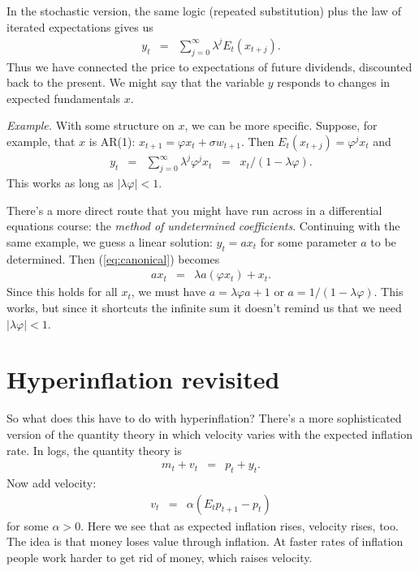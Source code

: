 \documentclass[11pt]{article}
\begin{document}
In the stochastic version, the same logic (repeated substitution)
plus the law of iterated expectations gives us
\begin{eqnarray}
    y_t &=&  \sum_{j=0}^\infty \lambda^j E_t (x_{t+j}) .
    \label{eq:canonical-solution}
\end{eqnarray}
Thus we have connected the price to expectations of future dividends,
discounted back to the present.
We might say that the variable $y$ responds to changes in expected fundamentals $x$.


{\it Example.\/}
With some structure on $x$, we can be more specific.
Suppose, for example, that $x$ is AR(1):
$ x_{t+1} = \varphi x_t + \sigma w_{t+1}$.
Then $ E_t (x_{t+j}) = \varphi^j x_t $ and
\begin{eqnarray*}
    y_t &=&  \sum_{j=0}^\infty \lambda^j \varphi^j x_t
            \;\;=\;\; x_t /(1- \lambda \varphi).
\end{eqnarray*}
This works as long as $ |\lambda \varphi | < 1$.

There's a more direct route that you might have run across in
a differential equations course:  the {\it method of undetermined coefficients\/}.
Continuing with the same example,
we guess a linear solution:  $ y_t = a x_t$ for some parameter $a$ to be determined.
Then (\ref{eq:canonical}) becomes
\begin{eqnarray*}
    a x_t &=& \lambda a (\varphi x_t) + x_t .
\end{eqnarray*}
Since this holds for all $x_t$, we must have
$ a = \lambda \varphi a + 1 $ or $ a = 1/(1-\lambda \varphi)$.
This works, but since it shortcuts the infinite sum it doesn't remind
us that we need $ |\lambda \varphi | < 1 $.



\section{Hyperinflation revisited}

So what does this have to do with hyperinflation?
There's a more sophisticated version of the quantity theory in which
velocity varies with the expected inflation rate.
In logs, the quantity theory is
\begin{eqnarray*}
    m_t + v_t &=& p_t + y_t .
\end{eqnarray*}
Now add velocity:
\begin{eqnarray*}
    v_t &=& \alpha (E_t p_{t+1} - p_t )
\end{eqnarray*}
for some $\alpha > 0$.
Here we see that as expected inflation rises,
velocity rises, too.
The idea is that money loses value through inflation.
At faster rates of inflation people work harder to get rid of money,
which raises velocity.
\end{document}
